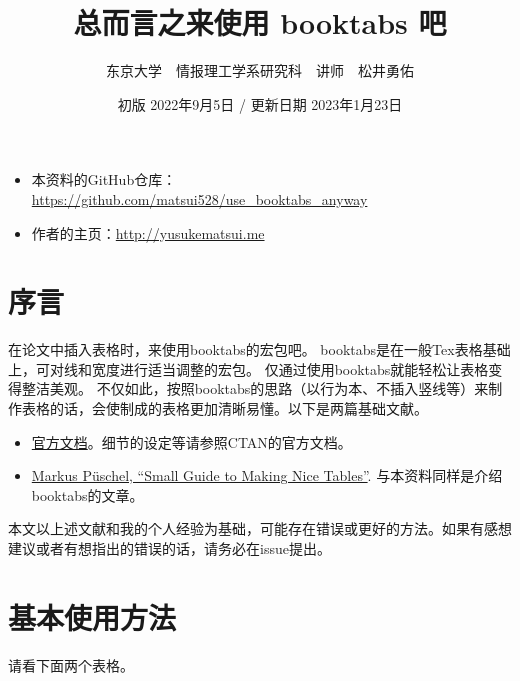 \documentclass{article}
\begin{document}
\title{总而言之来使用 booktabs 吧}
\author{东京大学　情报理工学系研究科　讲师　松井勇佑}
\date{初版 2022年9月5日 / 更新日期 2023年1月23日}
\maketitle

\begin{screen}
    \begin{itemize}
    \setlength{\itemsep}{-0.5ex}
    \item 本资料的GitHub仓库： \url{https://github.com/matsui528/use_booktabs_anyway}
    \item 作者的主页：\url{http://yusukematsui.me}
    \end{itemize}
\end{screen}

\section{序言}
在论文中插入表格时，来使用booktabs的宏包吧。
booktabs是在一般Tex表格基础上，可对线和宽度进行适当调整的宏包。
仅通过使用booktabs就能轻松让表格变得整洁美观。
不仅如此，按照booktabs的思路（以行为本、不插入竖线等）来制作表格的话，会使制成的表格更加清晰易懂。以下是两篇基础文献。
\begin{itemize}
    \setlength{\itemsep}{-0.5ex}
    \item \href{http://mirrors.ctan.org/macros/latex/contrib/booktabs/booktabs.pdf}{官方文档}。细节的设定等请参照CTAN的官方文档。
    \item \href{https://people.inf.ethz.ch/markusp/teaching/guides/guide-tables.pdf}{Markus P\"{u}schel, ``Small Guide to Making Nice Tables''}. 与本资料同样是介绍booktabs的文章。
\end{itemize}
本文以上述文献和我的个人经验为基础，可能存在错误或更好的方法。如果有感想建议或者有想指出的错误的话，请务必在issue提出。


\section{基本使用方法}
请看下面两个表格。
\end{document}
